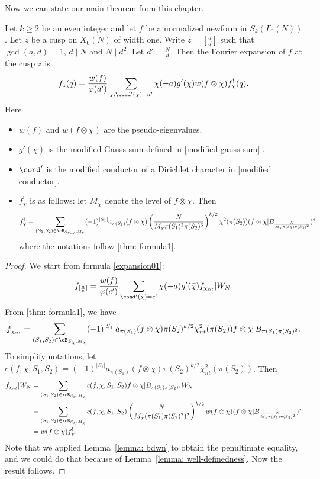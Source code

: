 \documentclass [11pt, proquest] {uwthesis}[2015/03/03]
\begin{document}
Now we can state our main theorem from this chapter.

\begin{theorem} \label{thm: ExpansionFormula}
Let $k \geq 2$ be an even integer and let $f$ be a normalized newform in $S_k(\Gamma_0(N))$. Let $z$ be a cusp on $X_0(N)$ of width one. Write $z = \left[ \frac{a}{d} \right]$ such that $\gcd(a,d) = 1$, $d \mid N$ and $N \mid d^2$. Let $d' = \frac{N}{d}$. Then the Fourier expansion of $f$  at the cusp $z$ is 
\[
	f_z(q) = \frac{w(f) }{\varphi(d')}\sum_{\chi: \cond'(\chi) = d'} \chi(-a) g'(\bar{\chi}) w(f \otimes \chi) f_\chi^{!}(q).
\]
Here

\begin{itemize}

\item $w(f)$ and $w(f \otimes \chi)$ are the pseudo-eigenvalues. 
\item $g'(\chi)$ is the modified Gauss sum defined in \ref{modified gauss sum} . 
\item $\cond'$ is the modified conductor of a Dirichlet character in \ref{modified conductor}. 
\item $f_\chi^{!}$ is as follows: let $M_\chi$ denote the level of  $f \otimes \chi$. Then
\[
f_\chi^{!} = \sum_{(S_1, S_2) \in \cB_{S_{\chi_{nt}},M_\chi}} (-1)^{|S_1|}a_{\pi(S_1)}(f \otimes \chi)  \left(\frac{N}{M_\chi \pi(S_1)^2 \pi(S_2)^3} \right)^{k/2}\chi^2(\pi(S_2)) (f \otimes \chi | B_{\frac{N}{M_\chi \pi (S_1) \pi(S_2)^2}})^*
\]
where the notations follow \ref{thm: formula1}.
\end{itemize}
\end{theorem}

\begin{proof}
We start from formula \ref{expansion01}:
$$f_{[\frac{a}{c}]}= \frac{w(f) }{\varphi(c')}\sum_{\cond'(\chi) = c'} \chi(-a)g'(\bar{\chi}) f_{\chi_{nt}} | W_N.$$
From \ref{thm: formula1}, we have 
	$$f_{\chi_{nt}} =  \sum_{(S_1, S_2) \in \cB_{S_\chi,M_\chi}} (-1)^{|S_1|} a_{\pi(S_1)}(f \otimes \chi)  \pi(S_2)^{k/2} \chi_{nt}^2(\pi(S_2)) f \otimes \chi | B_{\pi(S_1) \pi(S_2)^2}.$$
	To simplify notations, let $c(f, \chi, S_1, S_2) = (-1)^{|S_1|} a_{\pi(S_1)}(f \otimes \chi)  \pi(S_2)^{k/2} \chi_{nt}^2(\pi(S_2))$. Then 
\begin{align*}
	f_{\chi_{nt}} | W_N &= \sum_{(S_1, S_2) \in \cB_{S_\chi,M_\chi}} c(f, \chi, S_1, S_2) f \otimes \chi | B_{\pi(S_1) \pi(S_2)^2} W_N  \\
& =  \sum_{(S_1, S_2) \in \cB_{S_\chi,M_\chi}} c(f, \chi, S_1, S_2) \left(\frac{N}{M_\chi (\pi(S_1) \pi(S_2)^2)^2} \right)^{k/2} w(f\otimes \chi) (f \otimes \chi | B_{\frac{N}{M_\chi \pi (S_1) \pi(S_2)^2}})^* \\
& = w(f \otimes \chi) f_\chi^{!}. 
\end{align*}
Note that we applied Lemma~\ref{lemma: bdwn} to obtain the penultimate equality, and we could do that because of Lemma~\ref{lemma: well-definedness}. Now the result follows. 
\end{proof}
\end{document}
